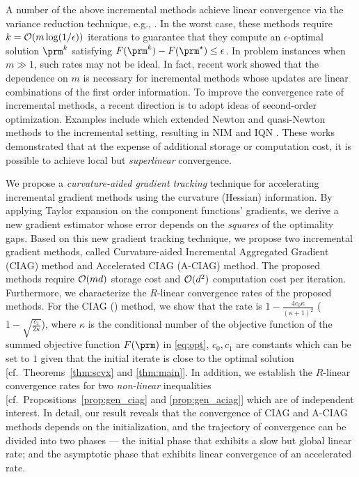 \documentclass[smallextended]{svjour3}       %
\begin{document}
A number of the above incremental methods achieve linear convergence 
via the variance reduction technique, e.g., \cite{xiao2014proximal,defazio2014saga,schmidt2017minimizing}.  
In the worst case, these methods require $k = {\cal O}( m \log (1/ \epsilon) )$ iterations to 
guarantee that they compute an $\epsilon$-optimal solution $\prm^k$ satisfying
$F(\prm^k) - F(\prm^\star) \leq \epsilon$. 
In problem instances when $m \gg 1$, such rates may not be ideal. In fact, recent work 
\cite{agarwal2015lower,arjevani2016dimension,lan2017optimal}
showed that the dependence on $m$
is necessary for incremental methods whose updates are 
linear combinations of the first order information.
To improve the convergence rate of incremental methods, 
a recent direction is to adopt ideas of second-order
optimization. Examples include \cite{gurbuzbalaban2015globally,rodomanov2016superlinearly,mokhtari2017iqn}
which extended Newton and 
quasi-Newton methods to the incremental setting, resulting in {\sf NIM} 
\cite{rodomanov2016superlinearly} and {\sf IQN} \cite{mokhtari2017iqn}. 
These works demonstrated that at the expense of additional storage
or computation cost,
it is possible to achieve local but \emph{superlinear} convergence.

We propose a \emph{curvature-aided gradient tracking} technique 
for accelerating incremental gradient methods using the curvature (Hessian) information. 
By applying Taylor expansion on the component functions' gradients, 
we derive a new gradient estimator whose error depends on the \emph{squares}
of the optimality gaps. Based on this new gradient tracking technique, 
we propose two incremental gradient methods, called
Curvature-aided Incremental Aggregated Gradient ({\sf CIAG}) method and 
Accelerated {\sf CIAG} ({\sf A-CIAG}) method.
The proposed methods require ${\cal O}(md)$ storage cost and ${\cal O}(d^2)$ 
computation cost per iteration. 
Furthermore, we characterize the $R$-linear convergence rates of the proposed methods. 
For the {\sf CIAG} () method, we show that the rate is $1 - \frac{4 c_0 \kappa}{(\kappa+1)^2}$ (\resp $1 - \sqrt{\frac{c_1}{2 \kappa}}$), where $\kappa$ is the conditional number of the objective function of the summed objective function $F(\prm)$ in \eqref{eq:opt}, $c_0,c_1$ are constants which can be set to $1$ given that the initial iterate is close to the optimal solution [cf.~Theorems~\ref{thm:scvx} and \ref{thm:main}]. 
In addition, we establish the $R$-linear convergence rates
for two \emph{non-linear} inequalities [cf.~Propositions~\ref{prop:gen_ciag} and \ref{prop:gen_aciag}] which are of independent interest. 
In detail, our result reveals that the convergence of {\sf CIAG} and {\sf A-CIAG} methods depends on the initialization,
and the trajectory of convergence can be divided into two 
phases --- the initial phase that exhibits a slow but global linear rate;
and the asymptotic phase that exhibits linear convergence of an accelerated rate.  
\end{document}
